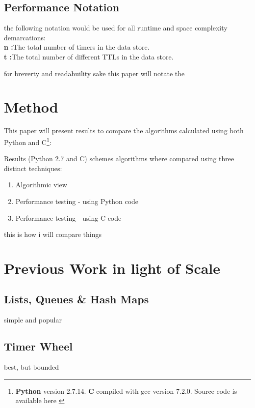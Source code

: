 \documentclass[twocolumn,a4paper]{article}
\begin{document}

\subsection{Performance Notation}

the following notation would be used for all runtime and space complexity demarcations: \\
\indent\textbf{n :}The total number of timers in the data store.\\
\indent\textbf{t :}The total number of different TTLs in the data store. \\

\vspace{15mm}



for breverty and readabuility sake this paper will notate the 

\section{Method}
This paper will present results to compare the algorithms calculated using both Python and C\footnote{\textbf{Python} version 2.7.14. \textbf{C} compiled with gcc version 7.2.0. Source code is available here \cite{GH}}:

Results 
 (Python 2.7 and C) schemes algorithms where compared using three distinct techniques:
\begin{enumerate}
	\item Algorithmic view
	\item Performance testing - using Python code
	\item Performance testing - using C code
\end{enumerate}

this is how i will compare things

\section{Previous Work in light of Scale}

\subsection{Lists, Queues \& Hash Maps}
simple and popular


\subsection{Timer Wheel}
best, but bounded
\end{document}
